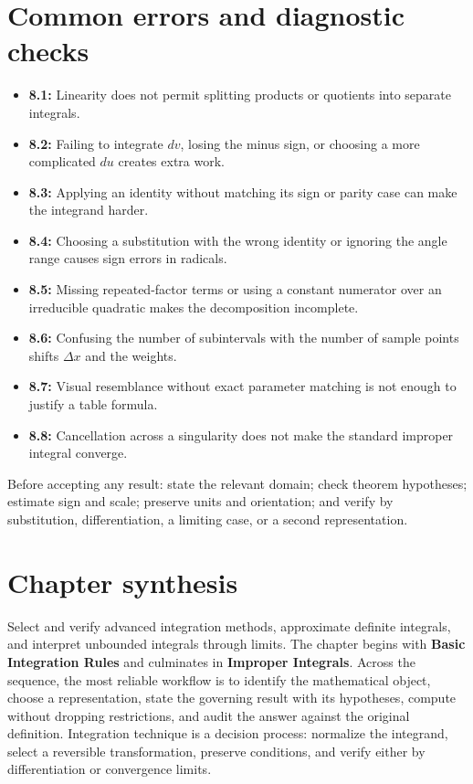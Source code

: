 \documentclass[11pt]{article}
\begin{document}
\section{Common errors and diagnostic checks}
\begin{warningbox}
\begin{itemize}
\item \textbf{8.1:} Linearity does not permit splitting products or quotients into separate integrals.
\item \textbf{8.2:} Failing to integrate $dv$, losing the minus sign, or choosing a more complicated $du$ creates extra work.
\item \textbf{8.3:} Applying an identity without matching its sign or parity case can make the integrand harder.
\item \textbf{8.4:} Choosing a substitution with the wrong identity or ignoring the angle range causes sign errors in radicals.
\item \textbf{8.5:} Missing repeated-factor terms or using a constant numerator over an irreducible quadratic makes the decomposition incomplete.
\item \textbf{8.6:} Confusing the number of subintervals with the number of sample points shifts $\Delta x$ and the weights.
\item \textbf{8.7:} Visual resemblance without exact parameter matching is not enough to justify a table formula.
\item \textbf{8.8:} Cancellation across a singularity does not make the standard improper integral converge.
\end{itemize}
\end{warningbox}
\begin{checkbox}
Before accepting any result: state the relevant domain; check theorem hypotheses; estimate sign and scale; preserve units and orientation; and verify by substitution, differentiation, a limiting case, or a second representation.
\end{checkbox}

\section{Chapter synthesis}
Select and verify advanced integration methods, approximate definite integrals, and interpret unbounded integrals through limits. The chapter begins with \textbf{Basic Integration Rules} and culminates in \textbf{Improper Integrals}. Across the sequence, the most reliable workflow is to identify the mathematical object, choose a representation, state the governing result with its hypotheses, compute without dropping restrictions, and audit the answer against the original definition. Integration technique is a decision process: normalize the integrand, select a reversible transformation, preserve conditions, and verify either by differentiation or convergence limits.
\end{document}
